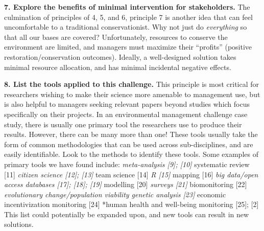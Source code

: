 \documentclass[10pt,letterpaper]{article}
\begin{document}
\textbf{7. Explore the benefits of minimal intervention for
stakeholders.} The culmination of principles of 4, 5, and 6, principle 7
is another idea that can feel uncomfortable to a traditional
conservationist. Why not just do \emph{everything} so that all our bases
are covered? Unfortunately, resources to conserve the environment are
limited, and managers must maximize their ``profits'' (positive
restoration/conservation outcomes). Ideally, a well-designed solution
takes minimal resource allocation, and has minimal incidental negative
effects.

\textbf{8. List the tools applied to this challenge.} This principle is
most critical for researchers wishing to make their science more
amenable to management use, but is also helpful to managers seeking
relevant papers beyond studies which focus specifically on their
projects. In an environmental management challenge case study, there is
usually one primary tool the researchers use to produce their results.
However, there can be many more than one! These tools usually take the
form of common methodologies that can be used across sub-disciplines,
and are easily identifiable. Look to the methods to identify these
tools. Some examples of primary tools we have found include:
\emph{meta-analysis {[}9{]}; {[}10{]} }systematic review {[}11{]}
\emph{citizen science {[}12{]}; {[}13{]} }team science {[}14{]} \emph{R
{[}15{]} }mapping {[}16{]} \emph{big data/open access databases
{[}17{]}; {[}18{]}; {[}19{]} }modelling {[}20{]} \emph{surveys {[}21{]}
}biomonitoring {[}22{]} \emph{evolutionary change/population viability
genetic analysis {[}23{]} }economic incentivization monitoring {[}24{]}
*human health and well-being monitoring {[}25{]}; {[}2{]} This list
could potentially be expanded upon, and new tools can result in new
solutions.
\end{document}
